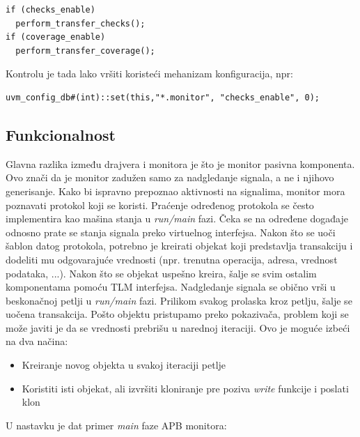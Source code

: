 \begin{lstlisting}
if (checks_enable)
  perform_transfer_checks();
if (coverage_enable)
  perform_transfer_coverage();
\end{lstlisting}

Kontrolu je tada lako vršiti koristeći mehanizam konfiguracija, npr:

\begin{lstlisting}
uvm_config_db#(int)::set(this,"*.monitor", "checks_enable", 0);
\end{lstlisting}


\subsection{Funkcionalnost}

Glavna razlika između drajvera i monitora je što je monitor pasivna komponenta.
Ovo znači da je monitor zadužen samo za nadgledanje signala, a ne i njihovo
generisanje. Kako bi ispravno prepoznao aktivnosti na signalima, monitor mora
poznavati protokol koji se koristi. Praćenje određenog protokola se često
implementira kao mašina stanja u \emph{run/main} fazi.
Čeka se na određene događaje odnosno prate se stanja signala preko virtuelnog
interfejsa.
Nakon što se uoči šablon datog protokola, potrebno je kreirati objekat koji
predstavlja transakciju i dodeliti mu odgovarajuće vrednosti (npr. trenutna
operacija, adresa, vrednost podataka, ...).
Nakon što se objekat uspešno kreira, šalje se svim ostalim komponentama pomoću
TLM interfejsa.
Nadgledanje signala se obično vrši u beskonačnoj petlji u \emph{run/main} fazi.
Prilikom svakog prolaska kroz petlju, šalje se uočena transakcija.
Pošto objektu pristupamo preko pokazivača, problem koji se može javiti je da se
vrednosti prebrišu u narednoj iteraciji.
Ovo je moguće izbeći na dva načina:

\begin{itemize}
\item Kreiranje novog objekta u svakoj iteraciji petlje
\item Koristiti isti objekat, ali izvršiti kloniranje pre poziva \emph{write} funkcije i poslati klon
\end{itemize}

U nastavku je dat primer \emph{main} faze APB monitora:



